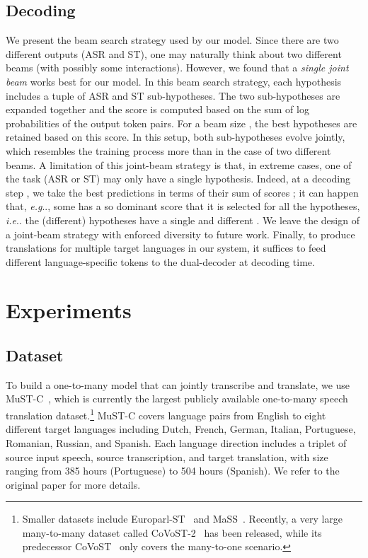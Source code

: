 \documentclass[11pt]{article}
\makeatletter
\DeclareRobustCommand\onedot{\futurelet\@let@token\@onedot}
\def\@onedot{\ifx\@let@token.\else.\null\fi\xspace}
\def\eg{\emph{e.g}\onedot} \def\Eg{\emph{E.g}\onedot}
\def\ie{\emph{i.e}\onedot} \def\Ie{\emph{I.e}\onedot}
\theoremstyle{plain}
\theoremstyle{definition}
\makeatother
\begin{document}
\subsection{Decoding}
\label{sec:decoding}
We present the beam search strategy used by our model.
Since there are two different outputs (ASR and ST), one may naturally think about two different beams (with possibly some interactions). However, we found that a \emph{single joint beam} works best for our model.
In this beam search strategy, each hypothesis includes a tuple of ASR and ST sub-hypotheses. The two sub-hypotheses are expanded together and the score is computed based on the sum of log probabilities of the output token pairs. For a beam size , the  best hypotheses are retained based on this score. In this setup, both sub-hypotheses evolve jointly,
which resembles the training process more than in the case of two different beams.
A limitation of this joint-beam strategy is that, in extreme cases,
one of the task (ASR or ST) may only have a single hypothesis. Indeed, at a decoding step , we take the best  predictions 
in terms of their sum of scores ; it can happen that, \eg, some  has a so dominant score that it is selected for all the hypotheses, \ie the  (different) hypotheses have a single  and  different . We leave the design of a joint-beam strategy with enforced diversity to future work. Finally, to produce translations for multiple target languages in our system, it suffices to feed different language-specific tokens to the dual-decoder at decoding time.






\section{Experiments}\label{sec:experiments}

\subsection{Dataset}
To build a one-to-many model that can jointly transcribe and translate, we use MuST-C~\cite{di2019must}, which is currently the largest publicly available one-to-many speech translation dataset.\footnote{Smaller datasets include Europarl-ST~\cite{iranzo2020europarl} and MaSS~\cite{boito2020mass}. Recently, a very large many-to-many dataset called CoVoST-2~\cite{wang2020covost2} has been released, while its predecessor CoVoST~\cite{wang2020covost} only covers the many-to-one scenario.}
MuST-C covers language pairs from English to eight different target languages including Dutch, French, German, Italian, Portuguese, Romanian, Russian, and Spanish. Each language direction includes a triplet of source input speech, source transcription, and target translation, with size ranging from 385 hours (Portuguese) to 504 hours (Spanish). We refer to the  original paper for more details.
\end{document}
